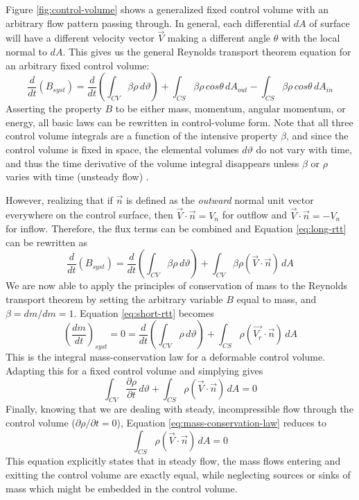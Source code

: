 \documentclass[10pt]{article} %
\numberwithin{equation}{section} %
\begin{document}
\begin{multicols}{2}
Figure \ref{fig:control-volume} shows a generalized fixed control volume with an arbitrary flow pattern passing through. In general, each differential $dA$ of surface will have a different velocity vector $\vec{V}$ making a different angle $\theta$ with the local normal to $dA$. This gives us the general Reynolds transport theorem equation for an arbitrary fixed control volume:
\begin{equation} \label{eq:long-rtt}
\frac{d}{dt}(B_{syst}) = \frac{d}{dt} \left( \int_{CV} \beta \rho\, d\vartheta \right) + \int_{CS} \beta \rho\, cos\theta\, dA_{out} - \int_{CS} \beta \rho\, cos\theta\, dA_{in}
\end{equation}
Asserting the property $B$ to be either mass, momentum, angular momentum, or energy, all basic laws can be rewritten in control-volume form. Note that all three control volume integrals are a function of the intensive property $\beta$, and since the control volume is fixed in space, the elemental volumes $d\vartheta$ do not vary with time, and thus the time derivative of the volume integral disappears unless $\beta$ or $\rho$ varies with time (unsteady flow) \cite{fluid-mechanics}.

However, realizing that if $\vec{n}$ is defined as the \textit{outward} normal unit vector everywhere on the control surface, then $\vec{V} \cdot \vec{n} = V_{n}$ for outflow and $\vec{V} \cdot \vec{n} = -V_{n}$ for inflow. Therefore, the flux terms can be combined and Equation \ref{eq:long-rtt} can be rewritten as
\begin{equation} \label{eq:short-rtt}
\frac{d}{dt}(B_{syst}) = \frac{d}{dt} \left( \int_{CV} \beta \rho\, d\vartheta \right) + \int_{CV} \beta \rho(\vec{V} \cdot \vec{n})\, dA
\end{equation}
We are now able to apply the principles of conservation of mass to the Reynolds transport theorem by setting the arbitrary variable $B$ equal to mass, and $\beta = dm/dm =1$. Equation \ref{eq:short-rtt} becomes
\begin{equation}
\left( \frac{dm}{dt} \right)_{syst} = 0 = \frac{d}{dt} \left( \int_{CV} \rho\, d\vartheta \right) + \int_{CS} \rho(\vec{V_{r}} \cdot \vec{n})\, dA
\end{equation}
This is the integral mass-conservation law for a deformable control volume. Adapting this for a fixed control volume and simplying gives
\begin{equation} \label{eq:mass-conservation-law}
\int_{CV} \frac{\partial \rho}{\partial t}\, d\vartheta + \int_{CS} \rho(\vec{V} \cdot \vec{n})\, dA = 0
\end{equation}
Finally, knowing that we are dealing with steady, incompressible flow through the control volume ($\partial \rho/ \partial t = 0$), Equation \ref{eq:mass-conservation-law} reduces to
\begin{equation} \label{eq:continuity-relation}
\int_{CS} \rho(\vec{V} \cdot \vec{n})\, dA = 0
\end{equation}
This equation explicitly states that in steady flow, the mass flows entering and exitting the control volume are exactly equal, while neglecting sources or sinks of mass which might be embedded in the control volume.


\end{multicols}
\end{document}
